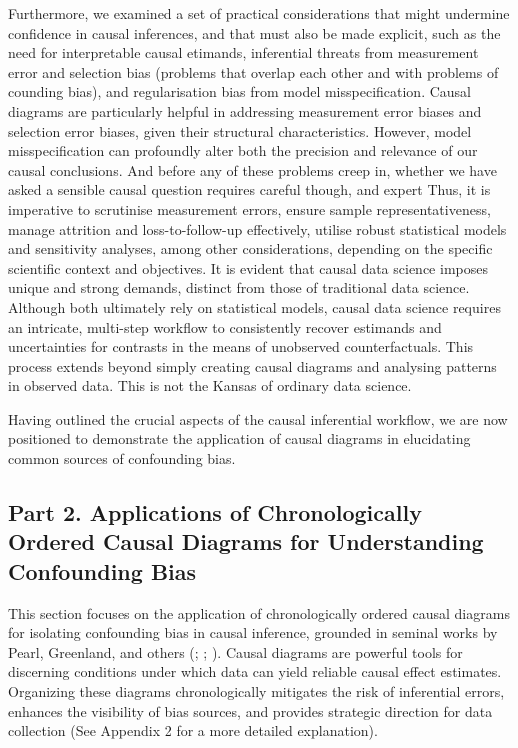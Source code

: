 \documentclass[
  singlecolumn,
  9pt]{article}
\begin{document}
Furthermore, we examined a set of practical considerations that might
undermine confidence in causal inferences, and that must also be made
explicit, such as the need for interpretable causal etimands,
inferential threats from measurement error and selection bias (problems
that overlap each other and with problems of counding bias), and
regularisation bias from model misspecification. Causal diagrams are
particularly helpful in addressing measurement error biases and
selection error biases, given their structural characteristics. However,
model misspecification can profoundly alter both the precision and
relevance of our causal conclusions. And before any of these problems
creep in, whether we have asked a sensible causal question requires
careful though, and expert Thus, it is imperative to scrutinise
measurement errors, ensure sample representativeness, manage attrition
and loss-to-follow-up effectively, utilise robust statistical models and
sensitivity analyses, among other considerations, depending on the
specific scientific context and objectives. It is evident that causal
data science imposes unique and strong demands, distinct from those of
traditional data science. Although both ultimately rely on statistical
models, causal data science requires an intricate, multi-step workflow
to consistently recover estimands and uncertainties for contrasts in the
means of unobserved counterfactuals. This process extends beyond simply
creating causal diagrams and analysing patterns in observed data. This
is not the Kansas of ordinary data science.

Having outlined the crucial aspects of the causal inferential workflow,
we are now positioned to demonstrate the application of causal diagrams
in elucidating common sources of confounding bias.

\subsection{Part 2. Applications of Chronologically Ordered Causal
Diagrams for Understanding Confounding
Bias}\label{part-2.-applications-of-chronologically-ordered-causal-diagrams-for-understanding-confounding-bias}

This section focuses on the application of chronologically ordered
causal diagrams for isolating confounding bias in causal inference,
grounded in seminal works by Pearl, Greenland, and others
(;
; ). Causal diagrams are powerful tools for discerning
conditions under which data can yield reliable causal effect estimates.
Organizing these diagrams chronologically mitigates the risk of
inferential errors, enhances the visibility of bias sources, and
provides strategic direction for data collection (See Appendix 2 for a
more detailed explanation).
\end{document}
